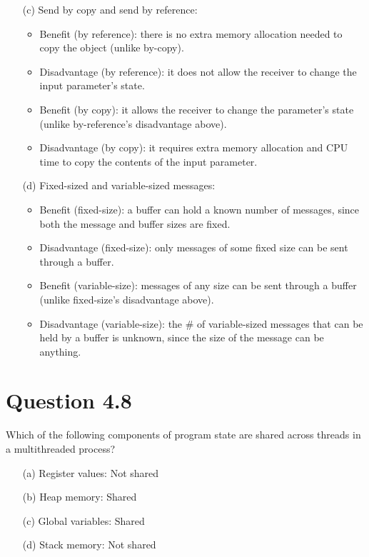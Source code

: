 \documentclass[12pt]{article}
\begin{document}
{\begin{enumerate}
\item[(c)]Send by copy and send by reference: {\color{black}
\begin{itemize}
\item Benefit (by reference): there is no extra memory allocation needed to copy the object (unlike by-copy).
\item Disadvantage (by reference): it does not allow the receiver to change the input parameter's state.
\item Benefit (by copy): it allows the receiver to change the parameter's state (unlike by-reference's disadvantage above).
\item Disadvantage (by copy): it requires extra memory allocation and CPU time to copy the contents of the input parameter.
\end{itemize}
}

\item[(d)]Fixed-sized and variable-sized messages: {\color{black}
\begin{itemize}
\item Benefit (fixed-size): a buffer can hold a known number of messages, since both the message and buffer sizes are fixed.
\item Disadvantage (fixed-size): only messages of some fixed size can be sent through a buffer.
\item Benefit (variable-size): messages of any size can be sent through a buffer (unlike fixed-size's disadvantage above).
\item Disadvantage (variable-size): the \# of variable-sized messages that can be held by a buffer is unknown, since the size of the message can be anything.
\end{itemize}
}


\end{enumerate}
}

\section*{Question 4.8} {\color{blue}Which of the following components of program state are shared across threads in a multithreaded process?
\begin{enumerate}
\item[(a)]Register values: {\color{black}Not shared}
\item[(b)]Heap memory: {\color{black}Shared}
\item[(c)]Global variables: {\color{black}Shared}
\item[(d)]Stack memory: {\color{black}Not shared}
\end{enumerate}
}
\end{document}
